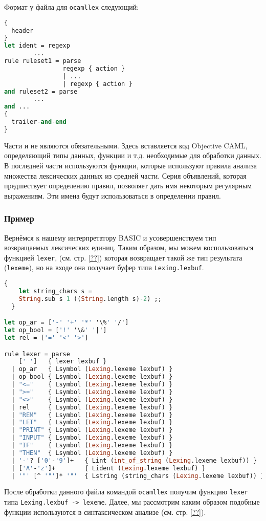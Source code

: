 Формат у файла для \texttt{ocamllex} следующий:

\begin{lstlisting}[language=Caml]
{
  header
}
let ident = regexp
        ...
rule ruleset1 = parse
                regexp { action }
                | ...
                | regexp { action }
and ruleset2 = parse
        ...
and ...
{
  trailer-and-end
}
\end{lstlisting}

Части  и  не являются обязательными.
Здесь вставляется код Objective CAML, определяющий типы данных, функции и т.д.
необходимые для обработки данных. В последней части используются функции,
которые используют правила анализа множества лексических данных из средней
части. Серия объявлений, которая предшествует определению правил, позволяет дать
имя некоторым регулярным выражениям. Эти имена будут использоваться в
определении правил.

\subsubsection{Пример}

Вернёмся к нашему интерпретатору BASIC и усовершенствуем тип возвращаемых
лексических единиц. Таким образом, мы можем воспользоваться функцией
\texttt{lexer}, (см. стр.  \ref{??}) которая возвращает такой же тип результата
(\texttt{lexeme}), но на входе она получает буфер типа \texttt{Lexing.lexbuf}.

\begin{lstlisting}[language=Caml]
  {
    let string_chars s =
    String.sub s 1 ((String.length s)-2) ;;
  }

let op_ar = ['-' '+' '*' '\%' '/']
let op_bool = ['!' '\&' '|']
let rel = ['=' '<' '>']

rule lexer = parse
    [' ']   { lexer lexbuf }
  | op_ar   { Lsymbol (Lexing.lexeme lexbuf) }
  | op_bool { Lsymbol (Lexing.lexeme lexbuf) }
  | "<="    { Lsymbol (Lexing.lexeme lexbuf) }
  | ">="    { Lsymbol (Lexing.lexeme lexbuf) }
  | "<>"    { Lsymbol (Lexing.lexeme lexbuf) }
  | rel     { Lsymbol (Lexing.lexeme lexbuf) }
  | "REM"   { Lsymbol (Lexing.lexeme lexbuf) }
  | "LET"   { Lsymbol (Lexing.lexeme lexbuf) }
  | "PRINT" { Lsymbol (Lexing.lexeme lexbuf) }
  | "INPUT" { Lsymbol (Lexing.lexeme lexbuf) }
  | "IF"    { Lsymbol (Lexing.lexeme lexbuf) }
  | "THEN"  { Lsymbol (Lexing.lexeme lexbuf) }
  | '-'? ['0'-'9']+   { Lint (int_of_string (Lexing.lexeme lexbuf)) }
  | ['A'-'z']+        { Lident (Lexing.lexeme lexbuf) }
  | '"' [^ '"']* '"'  { Lstring (string_chars (Lexing.lexeme lexbuf)) }
\end{lstlisting}

После обработки данного файла командой \texttt{ocamllex} получим функцию
\texttt{lexer} типа \texttt{Lexing.lexbuf -> lexeme}. Далее, мы рассмотрим каким
образом подобные функции используются в синтаксическом анализе (см. стр.
\ref{??}).
